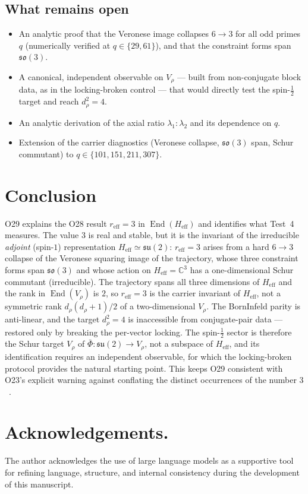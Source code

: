 \documentclass[12pt,a4paper]{article}
\theoremstyle{remark}
\DeclareMathOperator{\End}{End}
\newcommand{\su}{\mathfrak{su}}
\newcommand{\Heff}{H_{\mathrm{eff}}}
\newcommand{\Vrho}{V_{\rho}}
\newcommand{\reff}{r_{\mathrm{eff}}}
\begin{document}
    \subsection{What remains open}

      \begin{itemize}
        \item An analytic proof that the Veronese image collapses $6 \to 3$ for all odd primes $q$ (numerically
        verified at $q \in \{29, 61\}$), and that the constraint forms span $\mathfrak{so}(3)$.
        \item A canonical, independent observable on $\Vrho$ --- built from non-conjugate block data, as in the
        locking-broken control --- that would directly test the spin-$\tfrac{1}{2}$ target and reach $d_\rho^2 = 4$.
        \item An analytic derivation of the axial ratio $\lambda_1 : \lambda_2$ and its dependence on $q$.
        \item Extension of the carrier diagnostics (Veronese collapse, $\mathfrak{so}(3)$ span, Schur commutant) to
        $q \in \{101, 151, 211, 307\}$.
      \end{itemize}

  \section{Conclusion}

    O29 explains the O28 result $\reff = 3$ in $\End(\Heff)$ and identifies what Test~4 measures.
    The value $3$ is real and stable, but it is the invariant of the irreducible \emph{adjoint} (spin-$1$)
    representation $\Heff \simeq \su(2)$: $\reff = 3$ arises from a hard $6 \to 3$ collapse of the Veronese squaring
    image of the trajectory, whose three constraint forms span $\mathfrak{so}(3)$ and whose action on
    $\Heff = \mathbb{C}^3$ has a one-dimensional Schur commutant (irreducible).
    The trajectory spans all three dimensions of $\Heff$ and the rank in $\End(\Vrho)$ is $2$, so $\reff = 3$ is the
    carrier invariant of $\Heff$, not a symmetric rank $d_\rho(d_\rho+1)/2$ of a two-dimensional $\Vrho$.
    The Born\textendash{}Infeld parity is anti-linear, and the target $d_\rho^2 = 4$ is inaccessible from
    conjugate-pair data --- restored only by breaking the per-vector locking.
    The spin-$\tfrac{1}{2}$ sector is therefore the Schur target $\Vrho$ of $\bar\Phi : \su(2) \to \Vrho$, not a
    subspace of $\Heff$, and its identification requires an independent observable, for which the locking-broken
    protocol provides the natural starting point.
    This keeps O29 consistent with O23's explicit warning against conflating the distinct occurrences of the number
    $3$~\cite{Beau2026a27}.

    \clearpage
  \section*{Acknowledgements.}
    The author acknowledges the use of large language models as a supportive tool for refining language, structure,
    and internal consistency during the development of this manuscript.

    
    
\end{document}
